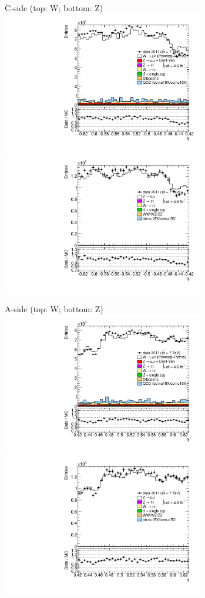 {

\colb[T]

C-side (top: W; bottom: Z)
\centering
\includegraphics[width=0.66\textwidth]{dates/20130306/figures/etaphi/W_3_C_stack_l_eta_NEG} \\
\includegraphics[width=0.66\textwidth]{dates/20130306/figures/etaphi/Z_3_C_stack_lN_eta_ALL.pdf}

A-side (top: W; bottom: Z)
\centering
\includegraphics[width=0.66\textwidth]{dates/20130306/figures/etaphi/W_3_A_stack_l_eta_NEG} \\
\includegraphics[width=0.66\textwidth]{dates/20130306/figures/etaphi/Z_3_A_stack_lN_eta_ALL.pdf} 

\cole
}


